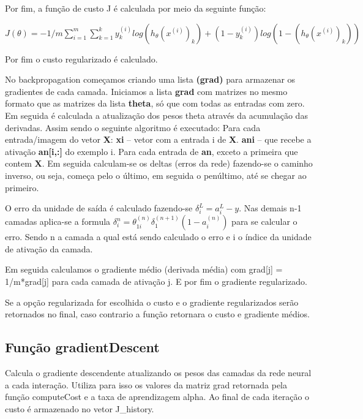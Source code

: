 \documentclass[12pt]{article}
\begin{document}
Por fim, a função de custo J é calculada por meio da seguinte função:

$J(\theta) = -1/m \sum^{m}_{i=1}\sum^{k}_{k=1} y^{(i)}_{k} log(h_{\theta}(x^{(i)})_{k})+(1 - y^{(i)}_{k})log(1 - (h_{\theta}(x^{(i)})_{k})) $

Por fim o custo regularizado é calculado. 

No backpropagation começamos criando uma lista \textbf{(grad)} para armazenar os gradientes de cada camada. Iniciamos a lista \textbf{grad} com matrizes no mesmo formato que as matrizes da lista \textbf{theta}, só que com todas as entradas com zero.
Em seguida é calculada a atualização dos pesos theta através da acumulação das derivadas. Assim sendo o seguinte algoritmo é executado:
Para cada entrada/imagem do vetor \textbf{X}:
\textbf{xi} – vetor com a entrada i de \textbf{X}.
\textbf{ani} – que recebe a ativação \textbf{an[i,:]} do exemplo i. Para cada entrada de \textbf{an}, exceto a primeira que contem \textbf{X}.
Em seguida calculam-se os deltas (erros da rede) fazendo-se o caminho inverso, ou seja, começa pelo o último, em seguida o penúltimo, até se chegar ao primeiro.

O erro da unidade de saída é calculado fazendo-se $\delta^{L}_i = a^{L}_{i} - y$.
Nas demais n-1 camadas aplica-se a formula $\delta^{n}_{i} = \theta^{(n)}_{1i}\delta^{(n+1)}_{1}(1-a^{(n)}_{i})$ para se calcular o erro. Sendo n a camada a qual está sendo calculado o erro e i o índice da unidade de ativação da camada. 

Em seguida calculamos o gradiente médio (derivada média) com grad[j] = 1/m*grad[j] para cada camada de ativação j. E por fim o gradiente regularizado.

Se a opção regularizada for escolhida o custo e o gradiente regularizados serão retornados no final, caso contrario a função retornara o custo e gradiente médios.


\subsection{Função gradientDescent}
Calcula o gradiente descendente atualizando os pesos das camadas da rede neural a cada interação. Utiliza para isso os valores da matriz grad retornada pela função computeCost e a taxa de aprendizagem alpha. Ao final de cada iteração o custo é armazenado no vetor J\_history.
\end{document}
